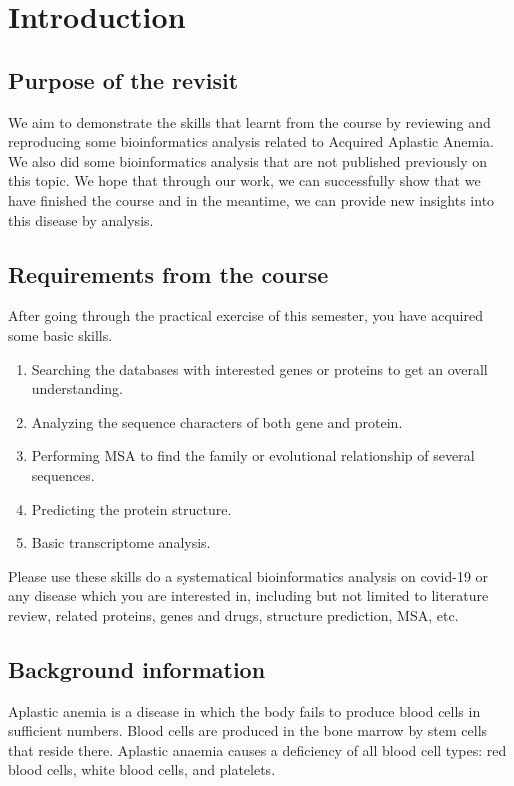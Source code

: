 \section{Introduction}

\subsection{Purpose of the revisit}
We aim to demonstrate the skills that learnt from the course by reviewing and reproducing some bioinformatics analysis related to Acquired Aplastic Anemia. We also did some bioinformatics analysis that are not published previously on this topic. We hope that through our work, we can successfully show that we have finished the course and in the meantime, we can provide new insights into this disease by analysis.

\subsection{Requirements from the course}
After going through the practical exercise of this semester, you have acquired some basic skills.
\begin{enumerate}
    \item Searching the databases with interested genes or proteins to get an overall understanding.
    \item Analyzing the sequence characters of both gene and protein.
    \item Performing MSA to find the family or evolutional relationship of several sequences.
    \item Predicting the protein structure.
    \item Basic transcriptome analysis.
\end{enumerate}
Please use these skills do a systematical bioinformatics analysis on covid-19 or any disease which you are interested in, including but not limited to literature review, related proteins, genes and drugs, structure prediction, MSA, etc.

\subsection{Background information}
Aplastic anemia is a disease in which the body fails to produce blood cells in sufficient numbers. Blood cells are produced in the bone marrow by stem cells that reside there. Aplastic anaemia causes a deficiency of all blood cell types: red blood cells, white blood cells, and platelets.\cite{young2018aplastic}\cite{fauci2015harrison}\cite{porter2011merck}

